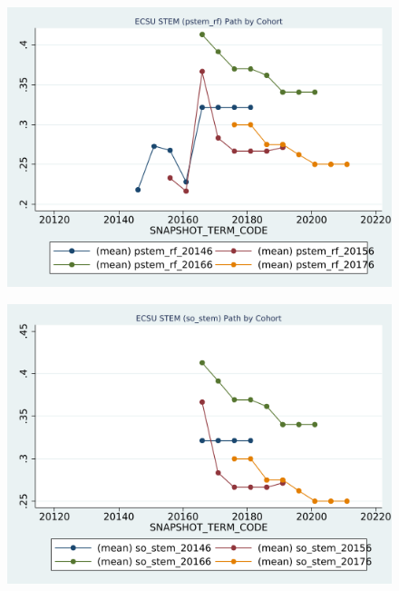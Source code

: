 \begin{figure}[h!]
\begin{centering}
\includegraphics[scale=1]{"figures/ECSU_pstem_rf_path_by_cohort_CAREER_STEM"}
\end{centering}
\end{figure}
\newpage
\begin{figure}[h!]
\begin{centering}
\includegraphics[scale=1]{"figures/ECSU_so_stem_path_by_cohort_CAREER_STEM"}
\end{centering}
\end{figure}
\newpage
